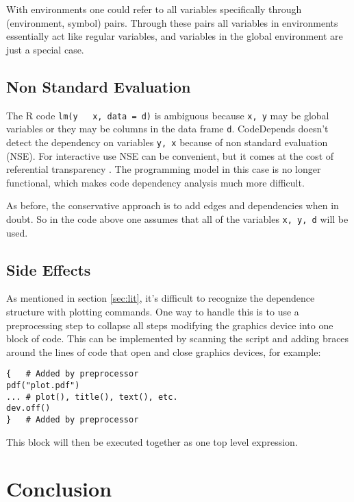 \documentclass[12pt]{article}
\begin{document}
With environments one could refer to all variables specifically through
(environment, symbol) pairs. Through these pairs all variables in
environments essentially act like regular variables, and variables in the
global environment are just a special case.

\subsection{Non Standard Evaluation}

The R code \texttt{lm(y ~ x, data = d)} is ambiguous because \texttt{x, y}
may be global variables or they may be columns in the data frame
\texttt{d}. CodeDepends doesn't detect the dependency on variables
\texttt{y, x} because of non standard evaluation (NSE). For interactive use
NSE can be convenient, but it comes at the cost of referential
transparency \cite{wickham2015advanced}. The programming model in this case
is no longer functional, which makes code dependency analysis much more
difficult.

As before, the conservative approach is to add edges and dependencies when in
doubt. So in the code above one assumes that all of the variables
\texttt{x, y, d} will be used.

\subsection{Side Effects}

As mentioned in section \ref{sec:lit}, it's difficult to recognize the
dependence structure with plotting commands. One way to handle this is to
use a preprocessing step to collapse all steps modifying the graphics
device into one block of code. This can be implemented by scanning the
script and adding braces around the lines of code that open and close
graphics devices, for example:

\begin{verbatim}
{   # Added by preprocessor
pdf("plot.pdf")
... # plot(), title(), text(), etc.
dev.off()
}   # Added by preprocessor
\end{verbatim}

This block will then be executed together as one top level expression.

\section{Conclusion}
\end{document}
